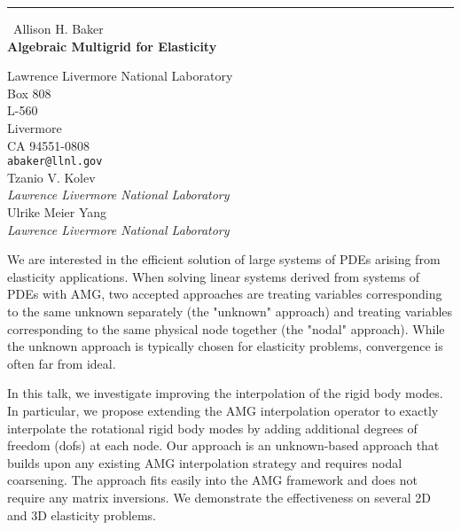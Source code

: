\documentclass{report}
\begin{document}
\begin{center}
\rule{6in}{1pt} \
{\large Allison H. Baker \\
{\bf Algebraic Multigrid for Elasticity}}

Lawrence Livermore National Laboratory \\ Box 808 \\ L-560 \\ Livermore \\ CA 94551-0808
\\
{\tt abaker@llnl.gov}\\
Tzanio V. Kolev\\
{\em Lawrence Livermore National Laboratory}\\
Ulrike Meier Yang\\
{\em Lawrence Livermore National Laboratory}\end{center}

We are interested in the efficient solution of large systems of PDEs
arising from elasticity applications. When solving linear systems
derived from systems of PDEs with AMG, two accepted approaches are
treating variables corresponding to the same unknown separately (the
"unknown" approach) and treating variables corresponding to the same
physical node together (the "nodal" approach). While the unknown
approach is typically chosen for elasticity problems, convergence is
often far from ideal.

In this talk, we investigate improving the interpolation of the rigid
body modes. In particular, we propose extending the AMG interpolation
operator to exactly interpolate the rotational rigid body modes by
adding additional degrees of freedom (dofs) at each node. Our approach
is an unknown-based approach that builds upon any existing AMG
interpolation strategy and requires nodal coarsening. The approach
fits easily into the AMG framework and does not require any matrix
inversions. We demonstrate the effectiveness on several 2D and 3D
elasticity problems.
\end{document}
